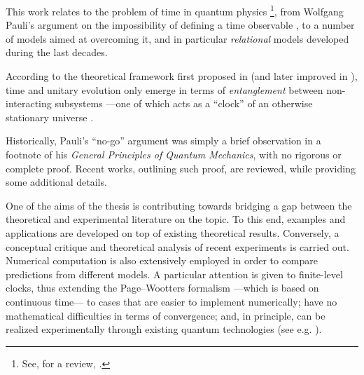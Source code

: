 This work relates to the problem of time in quantum physics%
\footnote{
  See, for a review, \cite{TQM1, TQM2}.
},
from Wolfgang Pauli's argument
on the impossibility of defining a time observable \parencite{PauliFootnote},
to a number of models aimed at overcoming it,
and in particular \emph{relational} models
developed during the last decades.

According to the theoretical framework first proposed in \cite{PageWootters}
(and later improved in \cite{Lloyd:Time}),
time and unitary evolution only emerge in
terms of \emph{entanglement} between non-interacting subsystems
---one of which acts as a ``clock''
of an otherwise stationary universe \parencite{Marletto:Evolution}.

Historically, Pauli's ``no-go'' argument was simply a brief observation in a footnote
of his \textit{General Principles of Quantum Mechanics},
with no rigorous or complete proof. Recent works, outlining such proof, are
reviewed, while providing some additional details.

One of the aims of the thesis
is contributing towards bridging a gap between the theoretical
and experimental literature on the topic.
To this end, examples and applications are developed on top of existing theoretical results.  
Conversely,
a conceptual critique and theoretical analysis
of recent experiments is carried out.
Numerical computation is also extensively employed in order to compare
predictions from different models. A particular attention is given
to finite-level clocks,
thus extending the Page--Wootters formalism ---which is based on continuous time---
to cases that are easier to implement numerically;
have no mathematical difficulties in terms of convergence;
and, in principle, can be realized experimentally through existing quantum technologies
(see e.g. \cite{FiniteHilb}). 